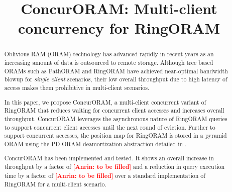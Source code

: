\documentclass{acm}
\title{ConcurORAM: Multi-client concurrency for RingORAM}
\newcommand{\todo}[1]{{\bf\textcolor{red}{ [Anrin: #1]}}}
\begin{document}
\maketitle
\begin{abstract}
 Oblivious RAM (ORAM) technology has advanced rapidly in recent years as 
 an increasing amount of data is outsourced to remote storage. Although 
 tree based ORAMs such as PathORAM \cite{pathoram} and RingORAM \cite{ringoram} 
 have achieved near-optimal 
 bandwidth blowup for {\em single client} scenarios, their low overall 
 throughput due to high latency of access 
 makes them prohibitive in multi-client scenarios. 
 
  In this paper, we propose ConcurORAM, a multi-client concurrent variant 
 of RingORAM that reduces waiting for concurrent client accesses and 
 increases overall throughput. ConcurORAM leverages the asynchronous nature of RingORAM queries to 
 support concurrent client accesses until the next round of eviction. Further to 
 support concurrent accesses, the position map for RingORAM is stored in a pyramid ORAM 
 using the PD-ORAM deamortization abstraction detailed in \cite{privatefs}. 
 
 ConcurORAM has been implemented and tested. It shows an overall increase 
 in throughput by a factor of \todo{to be filled} and a reduction in query execution time by a factor of \todo {to be filled} 
 over a standard implementation 
 of RingORAM for a multi-client scenario.
 
\end{abstract}









\end{document}
